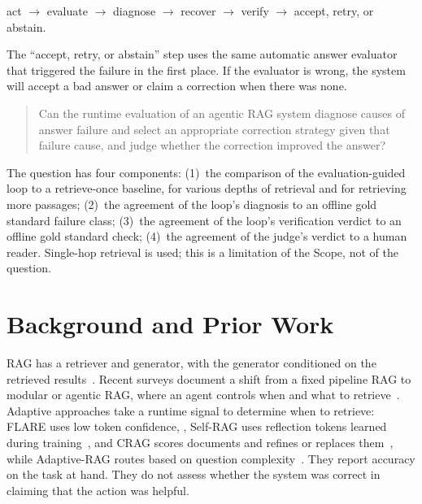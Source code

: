 \documentclass[12pt, a4paper, oneside]{report}
\begin{document}
\begin{center}
act $\rightarrow$ evaluate $\rightarrow$ diagnose $\rightarrow$ recover
$\rightarrow$ verify $\rightarrow$ accept, retry, or abstain.
\end{center}

The ``accept, retry, or abstain'' step uses the same automatic answer
evaluator that triggered the failure in the first place. If the evaluator
is wrong, the system will accept a bad answer or claim a correction when
there was none.

\begin{quote}
Can the runtime evaluation of an agentic RAG system diagnose causes of
answer failure and select an appropriate correction strategy given that
failure cause, and judge whether the correction improved the answer?
\end{quote}

The question has four components: (1)~the comparison of the
evaluation-guided loop to a retrieve-once baseline, for various depths of
retrieval and for retrieving more passages; (2)~the agreement of the
loop's diagnosis to an offline gold standard failure class; (3)~the
agreement of the loop's verification verdict to an offline gold
standard check; (4)~the agreement of the judge's verdict to a human reader.
Single-hop retrieval is used; this is a limitation of the Scope, not of the
question.

\section{Background and Prior Work}

RAG has a retriever and generator, with the generator conditioned on the
retrieved results~\cite{lewis2020rag}. Recent surveys document a shift from
a fixed pipeline RAG to modular or agentic RAG, where an agent controls
when and what to retrieve~\cite{gao2023ragsurvey,singh2025agenticrag}.
Adaptive approaches take a runtime signal to determine when to retrieve:
FLARE uses low token confidence, \cite{jiang2023flare}, Self-RAG uses
reflection tokens learned during training~\cite{asai2024selfrag}, and CRAG
scores documents and refines or replaces them~\cite{yan2024crag}, while
Adaptive-RAG routes based on question
complexity~\cite{jeong2024adaptiverag}. They report accuracy on the task at
hand. They do not assess whether the system was correct in claiming that
the action was helpful.
\end{document}
